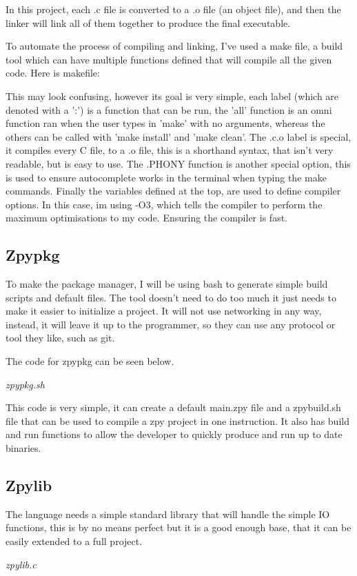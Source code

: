 \documentclass[a4paper,12pt]{article}
\begin{document}
{In this project, each .c file is converted to a .o file (an object file), and then the linker will link all of them together
to produce the final executable.

To automate the process of compiling and linking, I've used a make file, a build tool which can have multiple functions defined
that will compile all the given code. Here is makefile:



This may look confusing, however its goal is very simple, each label (which are denoted with a ':') is a function 
that can be run, the 'all' function is an omni function ran when the user types in 'make' with no arguments, whereas the others 
can be called with 'make install' and 'make clean'. The .c.o label is special, it compiles every C file, to a .o file, this is a 
shorthand syntax, that isn't very readable, but is easy to use. The .PHONY function is another special option, this is used to ensure 
autocomplete works in the terminal when typing the make commands. Finally the variables defined at the top, are used to define compiler
options. In this case, im using -O3, which tells the compiler to perform the maximum optimisations to my code. Ensuring the compiler is
fast.

\subsection{Zpypkg}
To make the package manager, I will be using bash to generate simple build scripts and default files. The tool doesn't need to do too
much it just needs to make it easier to initialize a project. It will not use networking in any way, instead, it will leave it up
to the programmer, so they can use any protocol or tool they like, such as git.

The code for zpypkg can be seen below.

\textit{zpypkg.sh}

This code is very simple, it can create a default main.zpy file and a zpybuild.sh file that can be used to compile a zpy project 
in one instruction. It also has build and run functions to allow the developer to quickly produce and run up to date binaries.

\subsection{Zpylib}
The language needs a simple standard library that will handle the simple IO functions, this is by no means perfect but it is a 
good enough base, that it can be easily extended to a full project.

\textit{zpylib.c}

}
\end{document}
